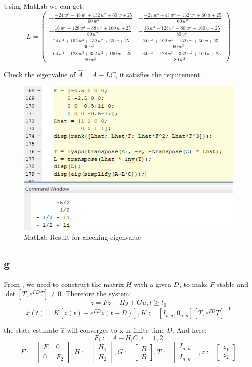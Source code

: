 \documentclass{article}
\begin{document}
Using MatLab we can get:
$$L = \left(\begin{array}{cc} -\frac{-24\,w^4-48\,w^3+132\,w^2+60\,w+25}{60\,w^3} & -\frac{-24\,w^4-48\,w^3+132\,w^2+60\,w+25}{60\,w^3}\\ -\frac{16\,w^4-128\,w^3-88\,w^2+160\,w+25}{80\,w^2} & -\frac{16\,w^4-128\,w^3-88\,w^2+160\,w+25}{80\,w^2}\\ \frac{-24\,w^4+192\,w^3+132\,w^2+60\,w+25}{60\,w^3} & \frac{-24\,w^4+192\,w^3+132\,w^2+60\,w+25}{60\,w^3}\\ \frac{-64\,w^4-128\,w^3+352\,w^2+160\,w+25}{80\,w^2} & \frac{-64\,w^4-128\,w^3+352\,w^2+160\,w+25}{80\,w^2} \end{array}\right)$$

Check the eigenvalue of $\hat{A}=A-LC$, it satisfies the requirement.

\begin{figure}[H]
\centering
\includegraphics[width=0.5\linewidth]{Part_C_f.png}
\caption{MatLab Result for checking eigenvalue}
\end{figure}

\subsection{g}
From \cite{engel2002continuous}, we need to construct the matrix $H$ with a given $D$, to make $F$ stable and $\det [T, e^{FD}T] \neq 0$. Therefore the system:
$$\dot{z} = F z + H y + G u, t \ge t_0$$
$$\hat{x}(t) = K[z(t)-e^{FD} z(t-D)], K := [I_{n,n}, 0_{n,n}][T, e^{FD}T]^{-1}$$

the state estimate $\hat{x}$ will converges to x in finite time $D$. And here:
$$F_i := A - H_i C, i=1,2$$
$$F := \left[
 \begin{matrix}
    F_1 & 0 \\
    0 & F_2
  \end{matrix}
  \right], H := \left[
 \begin{matrix}
    H_1 \\
    H_2
  \end{matrix}
  \right], G := \left[
 \begin{matrix}
    B \\
    B
  \end{matrix}
  \right], T := \left[
 \begin{matrix}
    I_{n,n} \\
    I_{n,n}
  \end{matrix}
  \right], z := \left[
 \begin{matrix}
    z_1 \\
    z_2
  \end{matrix}
  \right]$$
\end{document}
